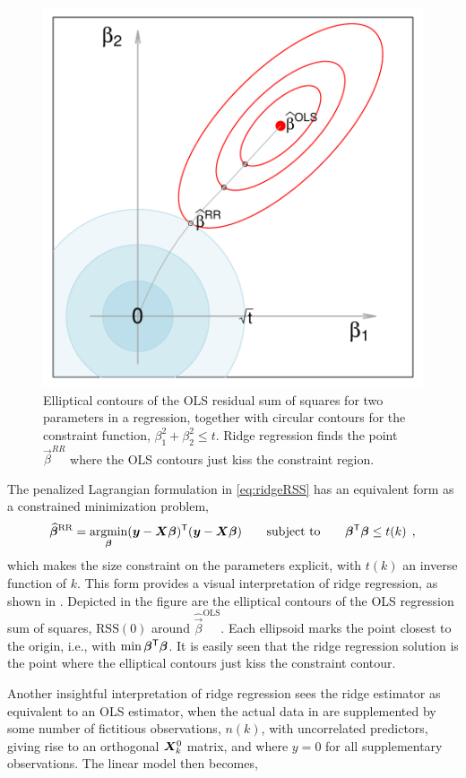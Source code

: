\begin{figure}[htb!]
  \centering
  \includegraphics[width=.6\textwidth,clip]{fig/ridge-demo}
  \caption{Elliptical contours of the OLS residual sum of squares for two parameters in a regression, together with
  circular contours for the constraint function, $\beta_1^2 + \beta_2^2 \le t$. Ridge regression finds the point $\vec{\beta}^{RR}$ where
  the OLS contours just kiss the constraint region.}%
  \label{fig:ridge-demo}
\end{figure}
The penalized Lagrangian formulation in \eqref{eq:ridgeRSS} has an equivalent form as a constrained
minimization problem,
\begin{equation}
\widehat{\bm{\beta}}^{\mathrm{RR}} = \mathop{\mathrm{argmin}}_{\bm{\beta}} (\bm{y}-\bm{X} \bm{\beta}) ^\mathsf{T}  (\bm{y}-\bm{X} \bm{\beta})
  \quad\quad\mbox{subject to}\quad\quad
   \bm{\beta}^\mathsf{T} \bm{\beta} \le t(k)  \:\: , \label{eq:ridge}
\end{equation}
which makes the size constraint on the parameters explicit, with $t(k)$ an inverse function of $k$. This form provides
a visual interpretation of ridge regression, as shown in . Depicted in the figure are the
elliptical contours of the OLS regression sum of squares, $\mathrm{RSS}(0)$ around $\widehat{\vec{\beta}}^{\mathrm{OLS}}$.  Each
ellipsoid marks the point closest to the origin, i.e., with $\min \bm{\beta}^\mathsf{T} \bm{\beta}$.
It is easily seen that the ridge regression solution is the point where the elliptical contours just kiss the
constraint contour.

Another insightful interpretation of ridge regression \citep{Marquardt:1970} sees the ridge estimator as equivalent to
an OLS estimator, when the actual data in  are supplemented by some number of fictitious observations, $n(k)$,
with uncorrelated predictors,
giving rise to
an orthogonal $\bm{X}_k^0$ matrix, and where $y=0$ for all supplementary observations. The linear model then becomes,

